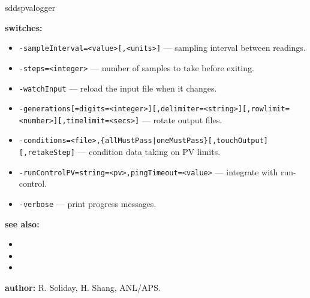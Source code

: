 \begin{sddsprog}{sddspvalogger}
\item \textbf{switches:}
\begin{itemize}
  \item {\tt -sampleInterval=<value>[,<units>]} --- sampling interval between readings.
  \item {\tt -steps=<integer>} --- number of samples to take before exiting.
  \item {\tt -watchInput} --- reload the input file when it changes.
  \item {\tt -generations[=digits=<integer>][,delimiter=<string>][,rowlimit=<number>][,timelimit=<secs>]} --- rotate output files.
  \item {\tt -conditions=<file>,\{allMustPass|oneMustPass\}[,touchOutput][,retakeStep]} --- condition data taking on PV limits.
  \item {\tt -runControlPV=string=<pv>,pingTimeout=<value>} --- integrate with run-control.
  \item {\tt -verbose} --- print progress messages.
\end{itemize}

\item \textbf{see also:}
\begin{itemize}
  \item {}
  \item {}
  \item {}
\end{itemize}
\item \textbf{author:} R. Soliday, H. Shang, ANL/APS.
\end{sddsprog}
